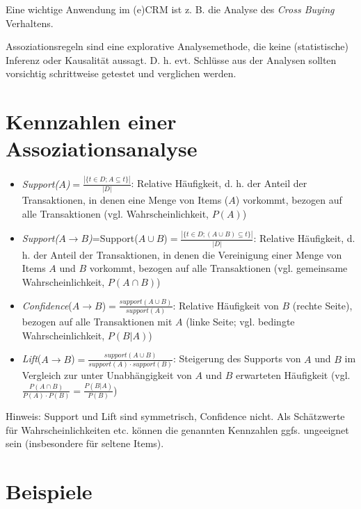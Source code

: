 \documentclass[12pt,]{book}
\providecommand{\tightlist}{%
  \setlength{\itemsep}{0pt}\setlength{\parskip}{0pt}}
\begin{document}
Eine wichtige Anwendung im (e)CRM ist z. B. die Analyse des \emph{Cross
Buying} Verhaltens.

Assoziationsregeln sind eine explorative Analysemethode, die keine
(statistische) Inferenz oder Kausalität aussagt. D. h. evt. Schlüsse aus
der Analysen sollten vorsichtig schrittweise getestet und verglichen
werden.

\section{Kennzahlen einer
Assoziationsanalyse}\label{kennzahlen-einer-assoziationsanalyse}

\begin{itemize}
\tightlist
\item
  \emph{Support(\(A\))}\(=\frac{|\{t\in D; A \subseteq t\}|}{|D|}\):
  Relative Häufigkeit, d. h. der Anteil der Transaktionen, in denen eine
  Menge von Items (\(A\)) vorkommt, bezogen auf alle Transaktionen (vgl.
  Wahrscheinlichkeit, \(P(A)\))
\item
  \emph{Support(\(A\rightarrow B\))}=Support(\(A\cup B\))\(=\frac{|\{t\in D; (A\cup B) \subseteq t\}|}{|D|}\):
  Relative Häufigkeit, d. h. der Anteil der Transaktionen, in denen die
  Vereinigung einer Menge von Items \(A\) und \(B\) vorkommt, bezogen
  auf alle Transaktionen (vgl. gemeinsame Wahrscheinlichkeit,
  \(P(A \cap B)\))
\item
  \emph{Confidence}(\(A \rightarrow B\))\(=\frac{support(A \cup B)}{support(A)}\):
  Relative Häufigkeit von \(B\) (rechte Seite), bezogen auf alle
  Transaktionen mit \(A\) (linke Seite; vgl. bedingte
  Wahrscheinlichkeit, \(P(B|A)\))
\item
  \emph{Lift}(\(A \rightarrow B\))\(=\frac{support(A \cup B)}{support(A) \cdot support(B)}\):
  Steigerung des Supports von \(A\) und \(B\) im Vergleich zur unter
  Unabhängigkeit von \(A\) und \(B\) erwarteten Häufigkeit (vgl.
  \(\frac{P(A\cap B)}{P(A) \cdot P(B)}=\frac{P(B|A)}{P(B)}\))
\end{itemize}

Hinweis: Support und Lift sind symmetrisch, Confidence nicht. Als
Schätzwerte für Wahrscheinlichkeiten etc. können die genannten
Kennzahlen ggfs. ungeeignet sein (insbesondere für seltene Items).

\section{Beispiele}\label{beispiele}
\end{document}
